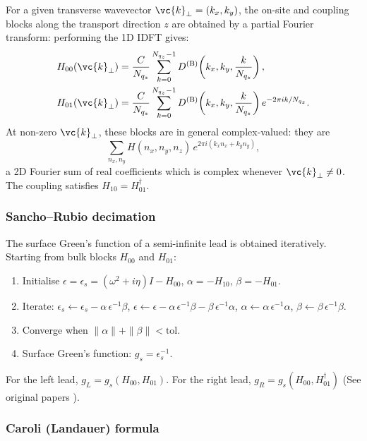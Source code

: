 For a given transverse wavevector $\vc{k}_\perp = (k_x, k_y)$, the
on-site and coupling blocks along the transport direction $z$ are
obtained by a partial Fourier transform: performing the 1D
IDFT gives:
\begin{align}
  H_{00}(\vc{k}_\perp)
    &= \frac{C}{N_{q_z}}
       \sum_{k=0}^{N_{q_z}-1}
       D^{(\mathrm{B})}\!\left(k_x, k_y, \frac{k}{N_{q_z}}\right),
  \label{eq:H00} \\
  H_{01}(\vc{k}_\perp)
    &= \frac{C}{N_{q_z}}
       \sum_{k=0}^{N_{q_z}-1}
       D^{(\mathrm{B})}\!\left(k_x, k_y, \frac{k}{N_{q_z}}\right)
       e^{-2\pi i k / N_{q_z}}.
  \label{eq:H01}
\end{align}
At non-zero $\vc{k}_\perp$, these blocks are in general
complex-valued: they are
\begin{equation}
    \sum_{n_x,n_y} H(n_x,n_y,n_z)\,e^{2\pi i(k_x n_x + k_y n_y)},
\end{equation}
a 2D Fourier sum of real coefficients which is complex whenever
$\vc{k}_\perp \neq 0$.  The coupling satisfies $H_{10} = H_{01}^\dagger$.

\subsubsection{Sancho--Rubio decimation}

The surface Green's function of a semi-infinite lead is obtained
iteratively.  Starting from bulk blocks $H_{00}$ and $H_{01}$:
\begin{enumerate}
  \item Initialise $\epsilon = \epsilon_s = (\omega^2 + i\eta)I -
        H_{00}$, $\alpha = -H_{10}$, $\beta = -H_{01}$.
  \item Iterate:
        $\epsilon_s \leftarrow \epsilon_s - \alpha\,\epsilon^{-1}\beta$,\quad
        $\epsilon   \leftarrow \epsilon - \alpha\,\epsilon^{-1}\beta
         - \beta\,\epsilon^{-1}\alpha$,\quad
        $\alpha     \leftarrow \alpha\,\epsilon^{-1}\alpha$,\quad
        $\beta      \leftarrow \beta\,\epsilon^{-1}\beta$.
  \item Converge when $\|\alpha\| + \|\beta\| < \text{tol}$.
  \item Surface Green's function: $g_s = \epsilon_s^{-1}$.
\end{enumerate}
For the left lead, $g_L = g_s(H_{00}, H_{01})$.  For the right lead,
$g_R = g_s(H_{00}, H_{01}^\dagger)$ (See original papers \cite{sancho_quick_1984, sancho_highly_1985}).

\subsubsection{Caroli (Landauer) formula}

